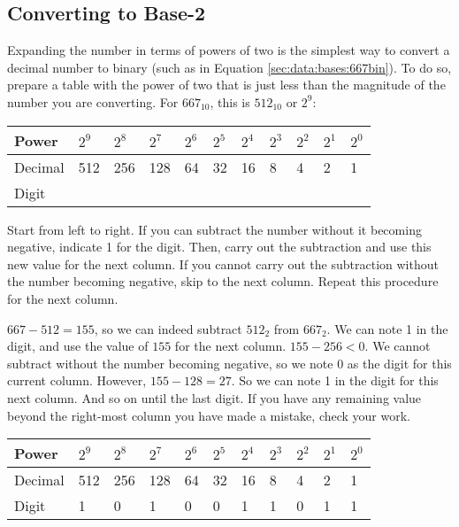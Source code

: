 \documentclass[letterpaper, 10pt]{book}
\begin{document}
\subsection{Converting to Base-2\label{sec:data:bases:bin}}

Expanding the number in terms of powers of two is the simplest way to convert a decimal number to binary 
(such as in Equation \ref{sec:data:bases:667bin}). To do so, prepare a table with the power of two that 
is just less than the magnitude of the number you are converting. 
For $667_{10}$, this is $512_{10}$ or $2^9$:

\noindent
\vspace{1em}
\begin{tabular}{|l|l|l|l|l|l|l|l|l|l|l|}\hline
Power & $2^9$ & $2^8$ & $2^7$ & $2^6$ & $2^5$ & $2^4$ & $2^3$ & $2^2$ & $2^1$ & $2^0$ \\\hline\hline
Decimal & 512 & 256 & 128 & 64 & 32 & 16 & 8 & 4 & 2 & 1 \\\hline
Digit &  &  &  &  &  &  &  &  &  &  \\\hline
\end{tabular}

\vspace{1em}
Start from left to right. If you can subtract the number without it becoming negative, indicate 1 for the digit. Then, carry out the subtraction and use this new value for the next column. If you cannot carry out the subtraction without the number becoming negative, skip to the next column. Repeat this procedure for the next column.

 $667-512=155$, so we can indeed subtract $512_2$ from $667_2$. We can note 1 in the digit, and use the value of $155$ for the next column. $155-256<0$. We cannot subtract without the number becoming negative, so we note 0 as the digit for this current column. However, $155-128=27$. So we can note 1 in the digit for this next column. And so on until the last digit. If you have any remaining value beyond the right-most column you have made a mistake, check your work.

\vspace{1em}
\begin{tabular}{|l|l|l|l|l|l|l|l|l|l|l|}\hline
Power & $2^9$ & $2^8$ & $2^7$ & $2^6$ & $2^5$ & $2^4$ & $2^3$ & $2^2$ & $2^1$ & $2^0$ \\\hline\hline
Decimal & 512 & 256 & 128 & 64 & 32 & 16 & 8 & 4 & 2 & 1 \\\hline
Digit & 1 & 0 & 1 & 0 & 0 & 1 & 1 & 0 & 1 & 1 \\\hline
\end{tabular}
\end{document}

